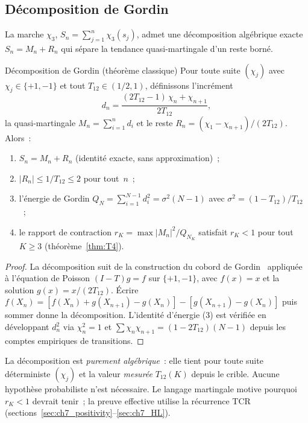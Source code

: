 \documentclass[12pt,a4paper]{article}
\begin{document}
\subsection{Décomposition de Gordin}
\label{sec:ch7_gordin}

La marche $\chi_3$, $S_n = \sum_{j=1}^n \chi_3(s_j)$, admet une
décomposition algébrique exacte $S_n = M_n + R_n$ qui sépare la
tendance quasi-martingale d'un reste borné.

\begin{thmbox}{Décomposition de Gordin (théorème classique)}
\label{thm:gordin}
Pour toute suite $(\chi_j)$ avec $\chi_j \in \{+1,-1\}$ et tout
$T_{12} \in (1/2,1)$, définissons l'incrément
\begin{equation}
  d_n = \frac{(2T_{12}-1)\,\chi_n + \chi_{n+1}}{2T_{12}},
  \label{eq:gordin_increment}
\end{equation}
la quasi-martingale $M_n = \sum_{i=1}^n d_i$ et le reste
$R_n = (\chi_1 - \chi_{n+1})/(2T_{12})$. Alors~:
\begin{enumerate}[nosep]
\item $S_n = M_n + R_n$ \quad (identité exacte, sans approximation)~;
\item $|R_n| \leq 1/T_{12} \leq 2$ pour tout~$n$~;
\item l'énergie de Gordin $Q_N = \sum_{i=1}^{N-1} d_i^2 = \sigma^2(N-1)$
  avec $\sigma^2 = (1-T_{12})/T_{12}$~;
\item le rapport de contraction $r_K = \max|M_n|^2/Q_{N_K}$ satisfait
  $r_K < 1$ pour tout $K \geq 3$ (théorème~\ref{thm:T4}).
\end{enumerate}

\begin{proof}
La décomposition suit de la construction du cobord de
Gordin~\cite{Gordin1969} appliquée à l'équation de Poisson
$(I-T)g = f$ sur $\{+1,-1\}$, avec $f(x)=x$ et la solution
$g(x) = x/(2T_{12})$. Écrire
$f(X_n) = [f(X_n) + g(X_{n+1}) - g(X_n)] - [g(X_{n+1}) - g(X_n)]$
puis sommer donne la décomposition. L'identité d'énergie (3) est
vérifiée en développant $d_n^2$ via $\chi_n^2 = 1$ et
$\sum \chi_n\chi_{n+1} = (1-2T_{12})(N-1)$ depuis les comptes
empiriques de transitions.
\end{proof}
\end{thmbox}

\begin{remarque}
La décomposition est \emph{purement algébrique}~: elle tient pour
toute suite déterministe $(\chi_j)$ et la valeur \emph{mesurée}
$T_{12}(K)$ depuis le crible. Aucune hypothèse probabiliste n'est
nécessaire. Le langage martingale motive pourquoi $r_K < 1$ devrait
tenir~; la preuve effective utilise la récurrence TCR
(sections~\ref{sec:ch7_positivity}--\ref{sec:ch7_HL}).
\end{remarque}
\end{document}
